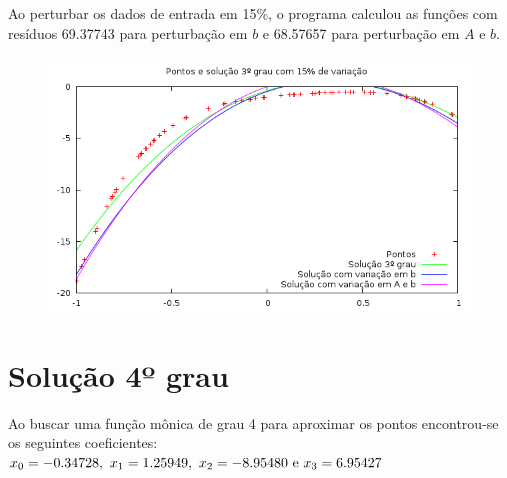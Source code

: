 Ao perturbar os dados de entrada em 15\%, o programa calculou as funções 
com resíduos 69.37743  para perturbação em $b$ e 68.57657 para perturbação em $A$ e $b$.
\begin{figure}[h]
\centering
\includegraphics[scale=0.7]{sol3grau_var}
\end{figure}

\newpage
\section{Solução 4º grau}

Ao buscar uma função mônica de grau 4 para aproximar os pontos encontrou-se os seguintes 
coeficientes:
\(x_0 = -0.34728 ,~  x_1 = 1.25949,~ x_2 =  -8.95480 ~$e$~ x_3 = 6.95427 \)

